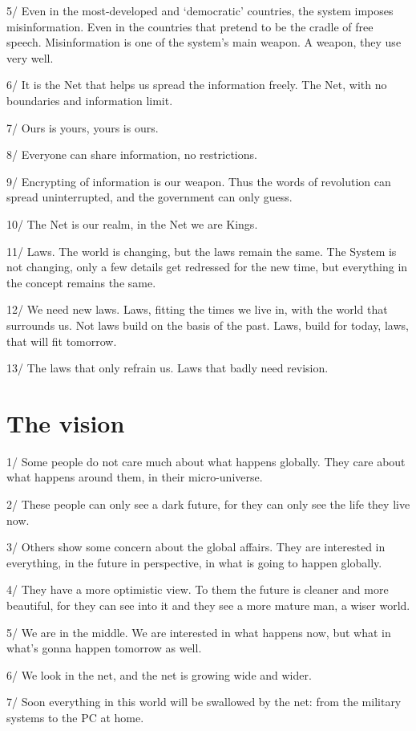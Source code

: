 \documentclass[letterpaper,12pt,english]{sphinxmanual}
\begin{document}
5/ Even in the most-developed and `democratic' countries, the system imposes misinformation. Even in the countries that pretend to be the cradle of free speech. Misinformation is one of the system's main weapon. A weapon, they use very well.

6/ It is the Net that helps us spread the information freely. The Net, with no boundaries and information limit.

7/ Ours is yours, yours is ours.

8/ Everyone can share information, no restrictions.

9/ Encrypting of information is our weapon. Thus the words of revolution can spread uninterrupted, and the government can only guess.

10/ The Net is our realm, in the Net we are Kings.

11/ Laws. The world is changing, but the laws remain the same. The System is not changing, only a few details get redressed for the new time, but everything in the concept remains the same.

12/ We need new laws. Laws, fitting the times we live in, with the world that surrounds us. Not laws build on the basis of the past. Laws, build for today, laws, that will fit tomorrow.

13/ The laws that only refrain us. Laws that badly need revision.


\section{The vision}
\label{1997:the-vision}
1/ Some people do not care much about what happens globally. They care about what happens around them, in their micro-universe.

2/ These people can only see a dark future, for they can only see the life they live now.

3/ Others show some concern about the global affairs. They are interested in everything, in the future in perspective, in what is going to happen globally.

4/ They have a more optimistic view. To them the future is cleaner and more beautiful, for they can see into it and they see a more mature man, a wiser world.

5/ We are in the middle. We are interested in what happens now, but what in what's gonna happen tomorrow as well.

6/ We look in the net, and the net is growing wide and wider.

7/ Soon everything in this world will be swallowed by the net: from the military systems to the PC at home.
\end{document}

